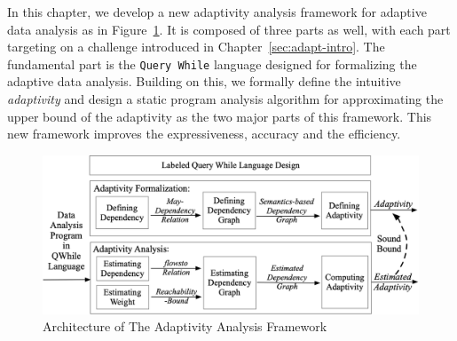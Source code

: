 
In this chapter, we develop a new adaptivity analysis framework for
adaptive data analysis as in Figure~\ref{fig:structure}.
It is composed of three parts as well, with each part targeting on a challenge introduced in Chapter~\ref{sec:adapt-intro}.
The fundamental part is the {\tt Query While} language designed for formalizing the 
adaptive data analysis. Building on this, 
we formally define the intuitive \emph{adaptivity} 
and design a static program analysis algorithm for approximating the upper bound of the 
adaptivity as the two major parts of this framework.
This new framework improves the expressiveness, accuracy and the efficiency.
\begin{figure}
   \centering   
   \includegraphics[width=1.0\textwidth]{figures/architecture}
  \caption{Architecture of The Adaptivity Analysis Framework}
   \label{fig:structure}
   \vspace{-1.0cm}
\end{figure}
